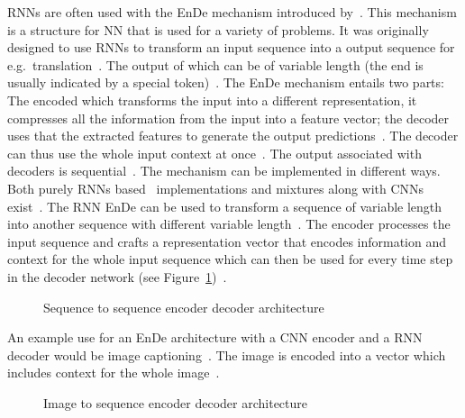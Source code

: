 \acp{RNN} are often used with the \ac{EnDe} mechanism introduced by~\cite{cho_learning_2014}.
This mechanism is a structure for \ac{NN} that is used for a variety of problems.
It was originally designed to use \acp{RNN} to transform an input sequence into a output sequence
for e.g.~translation~\citep{cho_learning_2014}.
The output of which can be of variable length (the end is usually indicated by a special
token)~\citep{cho_learning_2014,asadi_encoder-decoder_2020}.
The \ac{EnDe} mechanism entails two parts: The encoded which transforms the input into a
different representation, it compresses all the information from the input into a feature vector;
the decoder uses that the extracted features to generate the output
predictions~\citep{asadi_encoder-decoder_2020,cho_learning_2014}.
The decoder can thus use the whole input context at once~\citep{asadi_encoder-decoder_2020}.
The output associated with decoders is sequential~\citep{asadi_encoder-decoder_2020}.
The mechanism can be implemented in different ways.
Both purely \acp{RNN} based~\citep{cho_learning_2014} implementations and mixtures along with
\acp{CNN}~\citep{ghosh_visual_2017} exist~\citep{asadi_encoder-decoder_2020}.
The \ac{RNN} \ac{EnDe} can be used to transform a sequence of variable length into another
sequence with different variable length~\citep{cho_learning_2014}.
The encoder processes the input sequence and crafts a representation vector that encodes information
and context for the whole input sequence which can then be used for every time step in the decoder
network (see Figure~\ref{fig:enc-dec-rnn})~\citep{cho_learning_2014}.
\begin{figure}[h]
    \centering
    \caption[Sequence to sequence encoder decoder architecture]{%
        Sequence to sequence encoder decoder
        architecture~\citep{cho_learning_2014}\label{fig:enc-dec-rnn}
    }
\end{figure}
An example use for an \ac{EnDe} architecture with a \ac{CNN} encoder and a \ac{RNN} decoder
would be image captioning~\citep{asadi_encoder-decoder_2020}.
The image is encoded into a vector which includes context for the whole
image~\citep{asadi_encoder-decoder_2020}.
\begin{figure}[h]
    \centering
    \caption[Image to sequence encoder decoder architecture]{%
        Image to sequence encoder decoder
        architecture~\citep{asadi_encoder-decoder_2020}\label{fig:enc-dec-cnn}
    }
\end{figure}


